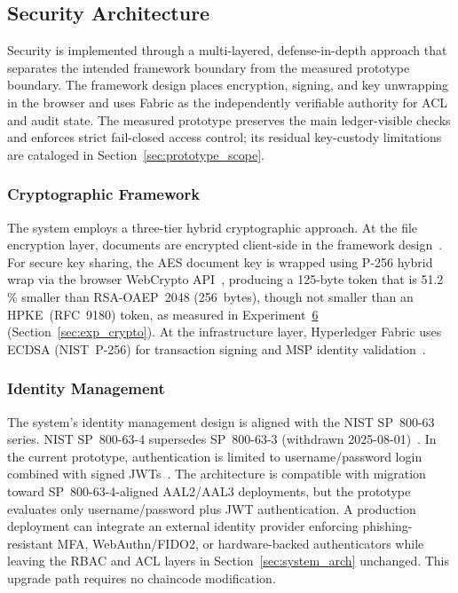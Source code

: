 \documentclass[preprint,12pt]{elsarticle}
\begin{document}
\flushbottom
\subsection{Security Architecture}
\label{sec:security_arch}

Security is implemented through a multi-layered, defense-in-depth
approach that separates the intended
framework boundary from the measured prototype boundary. The
framework design places encryption, signing, and key unwrapping in
the browser and uses Fabric as the independently verifiable authority
for ACL and audit state. The measured prototype preserves the main ledger-visible checks and
enforces strict fail-closed access control; its residual key-custody
limitations are cataloged in Section~\ref{sec:prototype_scope}.

\subsubsection{Cryptographic Framework}
The system employs a three-tier hybrid cryptographic approach. At the
file encryption layer, documents are encrypted client-side in the
framework design~\cite{fips197}. For secure key sharing, the AES
document key is wrapped using P-256 hybrid wrap via the browser WebCrypto
API~\cite{w3cWebCrypto}, producing a 125-byte token that is 51.2\,\%
smaller than RSA-OAEP~2048 (256~bytes), though not smaller than an
HPKE~(RFC~9180) token, as measured in
Experiment~\hyperref[sec:exp_crypto]{6} (Section~\ref{sec:exp_crypto}). At the infrastructure
layer, Hyperledger Fabric uses ECDSA (NIST~P-256) for transaction
signing and MSP identity validation~\cite{fabricMSP,fips1865}.

\subsubsection{Identity Management}
The system's identity management design is aligned with the NIST
SP~800-63 series. NIST SP~800-63-4 supersedes SP~800-63-3
(withdrawn 2025-08-01)~\cite{nist800634,nist800-63b}. In the current
prototype, authentication is limited to username/password login
combined with signed JWTs~\cite{rfc7519jwt}. The architecture is
compatible with migration toward SP~800-63-4-aligned AAL2/AAL3
deployments, but the prototype evaluates only username/password plus
JWT authentication. A production deployment can integrate an external
identity provider enforcing phishing-resistant MFA, WebAuthn/FIDO2,
or hardware-backed authenticators while leaving the RBAC and ACL
layers in Section~\ref{sec:system_arch} unchanged. This upgrade path
requires no chaincode modification.
\end{document}
